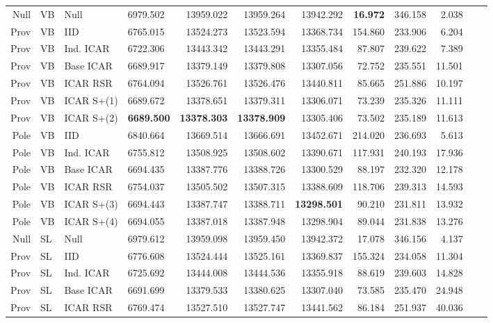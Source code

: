 \documentclass{book}
\begin{document}
\begin{appendices}
\begin{table}[ht]
\begin{tabular}{rlllrrrrrrrr}
  Null & VB & Null & 6979.502 & 13959.022 & 13959.264 & 13942.292 & \textbf{16.972} & 346.158 & 2.038 \\ 
  Prov & VB & IID & 6765.015 & 13524.273 & 13523.594 & 13368.734 & 154.860 & 233.906 & 6.204 \\ 
  Prov & VB & Ind. ICAR & 6722.306 & 13443.342 & 13443.291 & 13355.484 & 87.807 & 239.622 & 7.389 \\ 
  Prov & VB & Base ICAR & 6689.917 & 13379.149 & 13379.808 & 13307.056 & 72.752 & 235.551 & 11.501 \\ 
  Prov & VB & ICAR RSR & 6764.094 & 13526.761 & 13526.476 & 13440.811 & 85.665 & 251.886 & 10.197 \\ 
  Prov & VB & ICAR S+(1) & 6689.672 & 13378.651 & 13379.311 & 13306.071 & 73.239 & 235.326 & 11.111 \\ 
  Prov & VB & ICAR S+(2) & \textbf{6689.500} & \textbf{13378.303} & \textbf{13378.909} & 13305.406 & 73.502 & 235.189 & 11.613 \\ 
  Pole & VB & IID & 6840.664 & 13669.514 & 13666.691 & 13452.671 & 214.020 & 236.693 & 5.613 \\ 
  Pole & VB & Ind. ICAR & 6755.812 & 13508.925 & 13508.602 & 13390.671 & 117.931 & 240.193 & 17.936 \\ 
  Pole & VB & Base ICAR & 6694.435 & 13387.776 & 13388.726 & 13300.529 & 88.197 & 232.320 & 12.178 \\ 
  Pole & VB & ICAR RSR & 6754.037 & 13505.502 & 13507.315 & 13388.609 & 118.706 & 239.313 & 14.593 \\ 
  Pole & VB & ICAR S+(3) & 6694.443 & 13387.747 & 13388.711 & \textbf{13298.501} & 90.210 & 231.811 & 13.932 \\ 
  Pole & VB & ICAR S+(4) & 6694.055 & 13387.018 & 13387.948 & 13298.904 & 89.044 & 231.838 & 13.276 \\ 
  \midrule
  Null & SL & Null & 6979.612 & 13959.098 & 13959.450 & 13942.372 & 17.078 & 346.156 & 4.137 \\ 
  Prov & SL & IID & 6776.608 & 13524.444 & 13525.161 & 13369.837 & 155.324 & 234.058 & 11.304 \\ 
  Prov & SL & Ind. ICAR & 6725.692 & 13444.008 & 13444.536 & 13355.918 & 88.619 & 239.603 & 14.828 \\ 
  Prov & SL & Base ICAR & 6691.699 & 13379.533 & 13380.625 & 13307.040 & 73.585 & 235.470 & 24.948 \\ 
  Prov & SL & ICAR RSR & 6769.474 & 13527.510 & 13527.747 & 13441.562 & 86.184 & 251.937 & 40.036 \\ 

\end{tabular}
\end{table}
\end{appendices}
\end{document}
